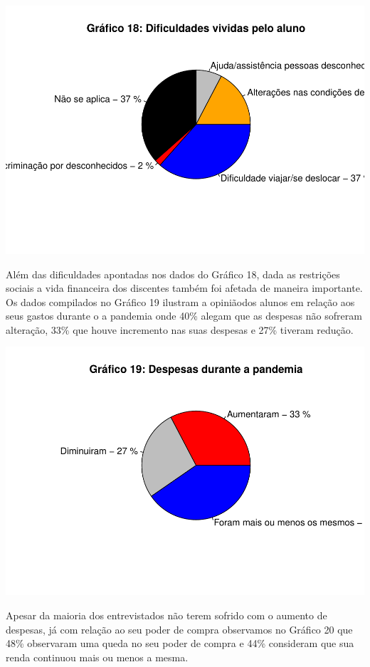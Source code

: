 \documentclass[
]{article}
\begin{document}
\includegraphics{consequencias-oriundas-da-pandemia-v1.0_files/figure-latex/grafico-18-1.pdf}

Além das dificuldades apontadas nos dados do Gráfico 18, dada as
restrições sociais a vida financeira dos discentes também foi afetada de
maneira importante. Os dados compilados no Gráfico 19 ilustram a
opiniãodos alunos em relação aos seus gastos durante o a pandemia onde
40\% alegam que as despesas não sofreram alteração, 33\% que houve
incremento nas suas despesas e 27\% tiveram redução.

\includegraphics{consequencias-oriundas-da-pandemia-v1.0_files/figure-latex/grafico-34-1.pdf}

Apesar da maioria dos entrevistados não terem sofrido com o aumento de
despesas, já com relação ao seu poder de compra observamos no Gráfico 20
que 48\% observaram uma queda no seu poder de compra e 44\% consideram
que sua renda continuou mais ou menos a mesma.
\end{document}
